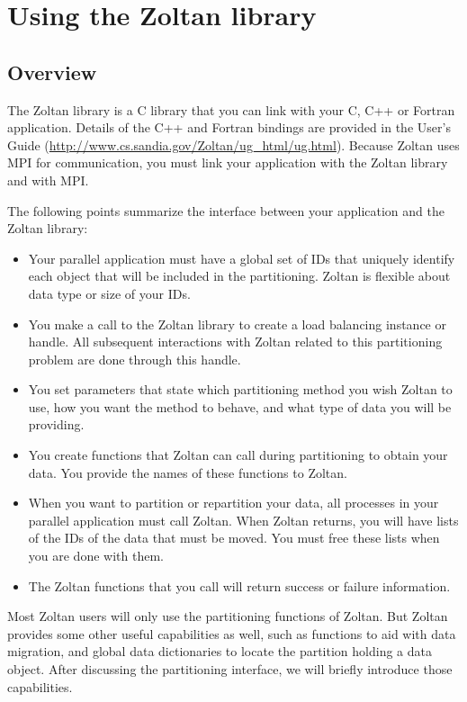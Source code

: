%
%
\chapter{Using the Zoltan library}
\label{cha:using}


\section{Overview}

The Zoltan library is a C library that you can link with your C,
C++ or Fortran application.  Details of the C++ and Fortran bindings
are provided in the User's Guide 
(\url{http://www.cs.sandia.gov/Zoltan/ug_html/ug.html}).
Because Zoltan uses MPI for communication, you must link your application
with the Zoltan library and with MPI.

The following points summarize the interface between your
application and the Zoltan library:

\begin{itemize}
\item Your parallel application must have a global set of IDs that uniquely identify each object that will be included in the partitioning.  Zoltan is flexible about data type or size of your IDs.
\item You make a call to the Zoltan library to create a load balancing instance or handle.  All subsequent interactions with Zoltan related to this partitioning problem are done through this handle.  
\item You set parameters that state which partitioning method you wish Zoltan to use, how you want the method to behave, and what type of data you will be providing.
\item You create functions that Zoltan can call during partitioning to obtain your data.  You provide the names of these functions to Zoltan.
\item When you want to partition or repartition your data, all processes in your parallel application must call Zoltan.  When Zoltan returns, you will have lists of the IDs of the data that must be moved.  You must free these lists when you are done with them.
\item The Zoltan functions that you call will return success or failure information.
\end{itemize}

Most Zoltan users will only use the partitioning functions of Zoltan.  But Zoltan provides
some other useful capabilities as well, such as functions to aid with data migration, and
global data dictionaries to locate the partition holding a data object.  
After discussing the partitioning interface, we will briefly introduce those capabilities.

